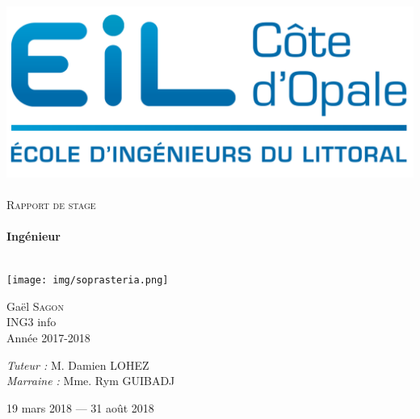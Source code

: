 \begin{titlepage}
  \begin{sffamily}
  \begin{center}

    \includegraphics[scale=0.9]{img/eilco.png}~\\[1.5cm]


    \textsc{\Large Rapport de stage}\\[1.5cm]

    \HRule \\[0.4cm]
    { \huge \bfseries Ingénieur\\[0.4cm] }

    \HRule \\[2cm]
    \texttt{[image: img/soprasteria.png]}
    \\[2cm]

    \begin{minipage}{0.4\textwidth}
      \begin{flushleft} \large
        Gaël \textsc{Sagon}\\
       ING3 info \\
       Année 2017-2018\\
      \end{flushleft}
    \end{minipage}
    \begin{minipage}{0.4\textwidth}
      \begin{flushright} \large
        \emph{Tuteur :} M. Damien LOHEZ\\
        \emph{Marraine : } Mme. Rym GUIBADJ
      \end{flushright}
    \end{minipage}

    \vfill

    {\large 19 mars 2018 — 31 août 2018}

  \end{center}
  \end{sffamily}
\end{titlepage}